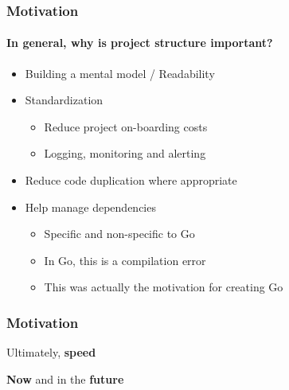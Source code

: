 
\begin{frame}
  \frametitle{Motivation}
  \framesubtitle{In general, why is project structure important?}

  \pause
  \begin{itemize}
    \item Building a mental model / Readability
    \pause
    \item Standardization
    \begin{itemize}
      \item Reduce project on-boarding costs
      \item Logging, monitoring and alerting
    \end{itemize}
  \pause
  \item Reduce code duplication where appropriate
  \pause
  \item Help manage dependencies
    \begin{itemize}
      \item Specific and non-specific to Go
      \item In Go, this is a compilation error
      \item This was actually the motivation for creating Go
    \end{itemize}
  \end{itemize}
\end{frame}

\begin{frame}
  \frametitle{Motivation}
  \centering
  \LARGE
  Ultimately, \textbf{speed}

  \pause
  \vspace{1em}
  \textbf{Now} and in the \textbf{future}
\end{frame}
